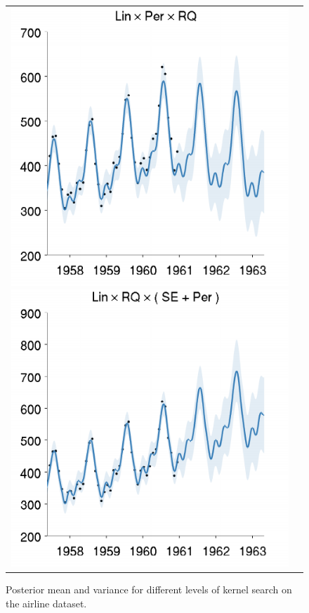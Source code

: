 \documentclass[twoside]{article}
\begin{document}
\begin{figure}[h!]
\begin{tabular}{cc}
\hspace{-1cm} \includegraphics[width=\wag,height=\hag]{../figures/decomposition/01-airline-s_max_level_2/01-airline-s_all_small} 
\hspace{-1cm} \includegraphics[width=\wag,height=\hag]{../figures/decomposition/01-airline-s_max_level_3/01-airline-s_all_small}
\end{tabular}
\caption{Posterior mean and variance for different levels of kernel search on the airline dataset. }
\label{fig:airline_grow}
\end{figure}
\end{document}
